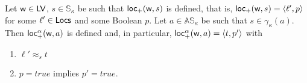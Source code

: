 \begin{proposition}
  \label{prop:abstract_location_correctness}
  Let $\mathsf{w}\in\mathsf{LV}$, $s\in\mathbb{S}_\kappa$ be such that
  $\mathsf{loc_+}(\mathsf{w},s)$ is defined,
  that is, $\mathsf{loc_+}(\mathsf{w},s)=\langle\ell',p\rangle$ for some $\ell'\in\mathsf{Locs}$
  and some Boolean $p$.
  Let $a\in\mathbb{AS}_\kappa$ be such that $s\in\gamma_\kappa(a)$.
  Then $\mathsf{loc_+^\alpha}(\mathsf{w},a)$ is defined and, in particular,
  $\mathsf{loc_+^\alpha}(\mathsf{w},a)=\langle t,p'\rangle$ with
  \begin{enumerate}
  \item $\ell'\approx_st$
  \item $p=\mathit{true}$ implies $p'=\mathit{true}$.
  \end{enumerate}
\end{proposition}
